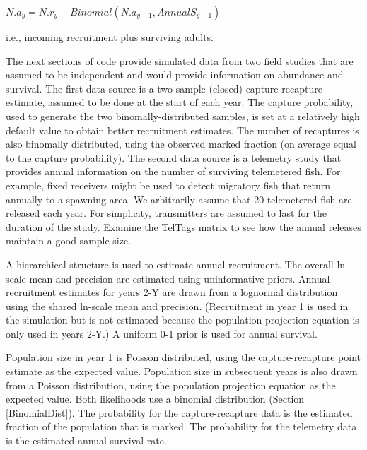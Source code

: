 \documentclass[
]{krantz}
\begin{document}
\(N.a_y = N.r_y + Binomial(N.a_{y-1}, AnnualS_{y-1})\)

i.e., incoming recruitment plus surviving adults.

The next sections of code provide simulated data from two field studies that are assumed to be independent and would provide information on abundance and survival. The first data source is a two-sample (closed) capture-recapture estimate, assumed to be done at the start of each year. The capture probability, used to generate the two binomally-distributed samples, is set at a relatively high default value to obtain better recruitment estimates. The number of recaptures is also binomally distributed, using the observed marked fraction (on average equal to the capture probability). The second data source is a telemetry study that provides annual information on the number of surviving telemetered fish. For example, fixed receivers might be used to detect migratory fish that return annually to a spawning area. We arbitrarily assume that 20 telemetered fish are released each year. For simplicity, transmitters are assumed to last for the duration of the study. Examine the TelTags matrix to see how the annual releases maintain a good sample size.

A hierarchical structure is used to estimate annual recruitment. The overall ln-scale mean and precision are estimated using uninformative priors. Annual recruitment estimates for years 2-Y are drawn from a lognormal distribution using the shared ln-scale mean and precision. (Recruitment in year 1 is used in the simulation but is not estimated because the population projection equation is only used in years 2-Y.) A uniform 0-1 prior is used for annual survival.

Population size in year 1 is Poisson distributed, using the capture-recapture point estimate as the expected value. Population size in subsequent years is also drawn from a Poisson distribution, using the population projection equation as the expected value. Both likelihoods use a binomial distribution (Section \ref{BinomialDist}). The probability for the capture-recapture data is the estimated fraction of the population that is marked. The probability for the telemetry data is the estimated annual survival rate.
\end{document}

